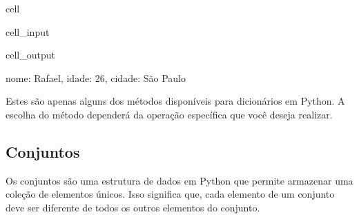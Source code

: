 \documentclass[letterpaper,10pt,english]{jupyterBook}
\begin{document}
\begin{sphinxuseclass}{cell}\begin{sphinxVerbatimInput}

\begin{sphinxuseclass}{cell_input}
\begin{sphinxVerbatim}[commandchars=\\\{\}]
     
   
\end{sphinxVerbatim}

\end{sphinxuseclass}\end{sphinxVerbatimInput}
\begin{sphinxVerbatimOutput}

\begin{sphinxuseclass}{cell_output}
\begin{sphinxVerbatim}[commandchars=\\\{\}]
\PYGZob{}\PYGZsq{}nome\PYGZsq{}: \PYGZsq{}Rafael\PYGZsq{}, \PYGZsq{}idade\PYGZsq{}: 26, \PYGZsq{}cidade\PYGZsq{}: \PYGZsq{}São Paulo\PYGZsq{}\PYGZcb{}
\end{sphinxVerbatim}

\end{sphinxuseclass}\end{sphinxVerbatimOutput}

\end{sphinxuseclass}
\sphinxAtStartPar
Estes são apenas alguns dos métodos disponíveis para dicionários em Python. A escolha do método dependerá da operação específica que você deseja realizar.


\subsection{Conjuntos}
\label{\detokenize{chapters/ch2/ch2:conjuntos}}
\sphinxAtStartPar
Os conjuntos são uma estrutura de dados em Python que permite armazenar uma coleção de elementos únicos. Isso significa que, cada elemento de um conjunto deve ser diferente de todos os outros elementos do conjunto.
\end{document}

